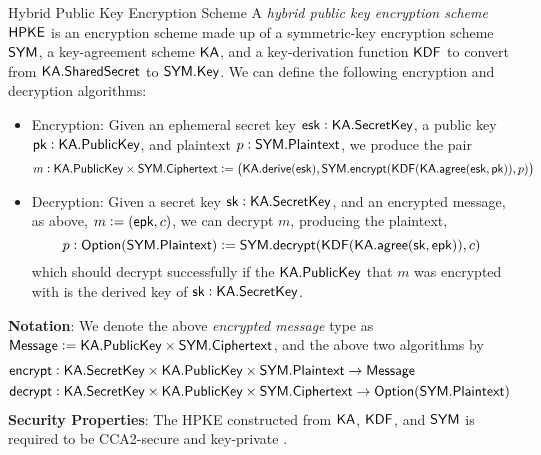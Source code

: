 \begin{definitiontoc}{Hybrid Public Key Encryption Scheme}
    A \emph{hybrid public key encryption scheme} \cite{irtf-cfrg-hpke-12} ${\textsf{HPKE}}$ is an encryption scheme made up of a symmetric-key encryption scheme ${\textsf{SYM}}$, a key-agreement scheme ${\textsf{KA}}$, and a key-derivation function ${\textsf{KDF}}$ to convert from ${\textsf{KA}}.{\textsf{SharedSecret}}$ to ${\textsf{SYM}}.{\textsf{Key}}$. We can define the following encryption and decryption algorithms:
    \begin{itemize}
        \item Encryption: Given an ephemeral secret key ${\textsf{esk}}: {\textsf{KA}}.{\textsf{SecretKey}}$, a public key ${\textsf{pk}}: {\textsf{KA}}.{\textsf{PublicKey}}$, and plaintext $p : {\textsf{SYM}}.{\textsf{Plaintext}}$, we produce the pair
            \[m : {\textsf{KA}}.{\textsf{PublicKey}} \times {\textsf{SYM}}.{\textsf{Ciphertext}} := \left({\textsf{KA}}.{\textsf{derive}}({\textsf{esk}}), {\textsf{SYM}}.{\textsf{encrypt}}({\textsf{KDF}}({\textsf{KA}}.{\textsf{agree}}({\textsf{esk}}, {\textsf{pk}})), p)\right)\]
        \item Decryption: Given a secret key ${\textsf{sk}} : {\textsf{KA}}.{\textsf{SecretKey}}$, and an encrypted message, as above, $m := ({\textsf{epk}}, c)$, we can decrypt $m$, producing the plaintext,
            \[p : {\textsf{Option}}({\textsf{SYM}}.{\textsf{Plaintext}}) := {\textsf{SYM}}.{\textsf{decrypt}}({\textsf{KDF}}({\textsf{KA}}.{\textsf{agree}}({\textsf{sk}}, {\textsf{epk}})), c)\]
            which should decrypt successfully if the ${\textsf{KA}}.{\textsf{PublicKey}}$ that $m$ was encrypted with is the derived key of ${\textsf{sk}} : {\textsf{KA}}.{\textsf{SecretKey}}$.
    \end{itemize}

    \textbf{Notation}: We denote the above \emph{encrypted message} type as ${\textsf{Message}} := {\textsf{KA}}.{\textsf{PublicKey}} \times {\textsf{SYM}}.{\textsf{Ciphertext}}$, and the above two algorithms by
    \begin{align*}
        {\textsf{encrypt}} &: {\textsf{KA}}.{\textsf{SecretKey}} \times {\textsf{KA}}.{\textsf{PublicKey}} \times {\textsf{SYM}}.{\textsf{Plaintext}} \to {\textsf{Message}} \\
        {\textsf{decrypt}} &: {\textsf{KA}}.{\textsf{SecretKey}} \times {\textsf{KA}}.{\textsf{PublicKey}} \times {\textsf{SYM}}.{\textsf{Ciphertext}} \to {\textsf{Option}}({\textsf{SYM}}.{\textsf{Plaintext}})
    \end{align*}
    \textbf{Security Properties}: The HPKE constructed from ${\textsf{KA}}$, ${\textsf{KDF}}$, and ${\textsf{SYM}}$ is required to be CCA2-secure and key-private \cite{BBDP01AC}. \\
\end{definitiontoc}

